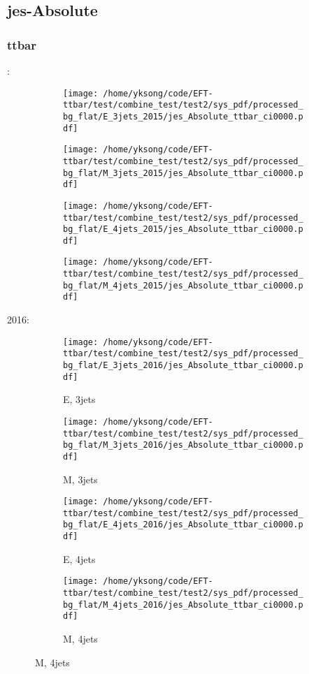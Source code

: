 \documentclass{beamer}
\begin{document}
\subsection{jes-Absolute}

\begin{frame}
\frametitle{ttbar}
\fontsize{5}{1}:
\begin{figure}
\centering
\begin{subfigure}[b]{0.24\textwidth}
\texttt{[image: /home/yksong/code/EFT-ttbar/test/combine\_test/test2/sys\_pdf/processed\_bg\_flat/E\_3jets\_2015/jes\_Absolute\_ttbar\_ci0000.pdf]}
\end{subfigure}
\begin{subfigure}[b]{0.24\textwidth}
\texttt{[image: /home/yksong/code/EFT-ttbar/test/combine\_test/test2/sys\_pdf/processed\_bg\_flat/M\_3jets\_2015/jes\_Absolute\_ttbar\_ci0000.pdf]}
\end{subfigure}
\begin{subfigure}[b]{0.24\textwidth}
\texttt{[image: /home/yksong/code/EFT-ttbar/test/combine\_test/test2/sys\_pdf/processed\_bg\_flat/E\_4jets\_2015/jes\_Absolute\_ttbar\_ci0000.pdf]}
\end{subfigure}
\begin{subfigure}[b]{0.24\textwidth}
\texttt{[image: /home/yksong/code/EFT-ttbar/test/combine\_test/test2/sys\_pdf/processed\_bg\_flat/M\_4jets\_2015/jes\_Absolute\_ttbar\_ci0000.pdf]}
\end{subfigure}
\end{figure}
2016:
\begin{figure}
\centering
\begin{subfigure}[b]{0.24\textwidth}
\texttt{[image: /home/yksong/code/EFT-ttbar/test/combine\_test/test2/sys\_pdf/processed\_bg\_flat/E\_3jets\_2016/jes\_Absolute\_ttbar\_ci0000.pdf]}
\captionsetup{font=tiny}
\caption{E, 3jets}
\end{subfigure}
\begin{subfigure}[b]{0.24\textwidth}
\texttt{[image: /home/yksong/code/EFT-ttbar/test/combine\_test/test2/sys\_pdf/processed\_bg\_flat/M\_3jets\_2016/jes\_Absolute\_ttbar\_ci0000.pdf]}
\captionsetup{font=tiny}
\caption{M, 3jets}
\end{subfigure}
\begin{subfigure}[b]{0.24\textwidth}
\texttt{[image: /home/yksong/code/EFT-ttbar/test/combine\_test/test2/sys\_pdf/processed\_bg\_flat/E\_4jets\_2016/jes\_Absolute\_ttbar\_ci0000.pdf]}
\captionsetup{font=tiny}
\caption{E, 4jets}
\end{subfigure}
\begin{subfigure}[b]{0.24\textwidth}
\texttt{[image: /home/yksong/code/EFT-ttbar/test/combine\_test/test2/sys\_pdf/processed\_bg\_flat/M\_4jets\_2016/jes\_Absolute\_ttbar\_ci0000.pdf]}
\captionsetup{font=tiny}
\caption{M, 4jets}
\end{subfigure}
\end{figure}
\end{frame}
\end{document}
